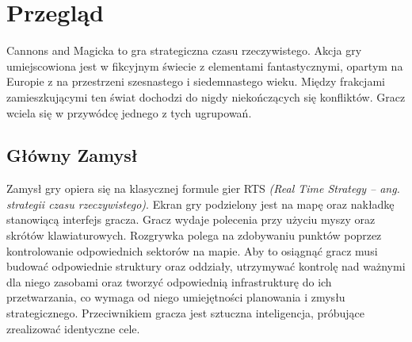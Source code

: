 \documentclass[a4paper]{scrreprt}
\title{\GameTiTle{}}
\subtitle{Dokument projektowy wersja 2}
\author{Laura Stasiulewicz}
\def \GameTiTle{Cannons and Magicka}
\begin{document}
\maketitle

\begin{abstract}
\GameTiTle{} to gra strategiczna czasu rzeczywistego. Celem gracza jest pokonanie komputerowego przeciwnika w walce o kontrolę nad punktem dominacji na mapie. Aby to uczynić, musi wykorzystać zdolność planowania, zarządzania zarówno jednostkami, jak i zasobami oraz wiedzy na temat dostępnych rodzajów oddziałów jakie może przywołać i interakcji między nimi.  %

\end{abstract}

{
  \hypersetup{linkcolor=black}
  \tableofcontents
}

\chapter{Przegląd}
\GameTiTle{} to gra strategiczna czasu rzeczywistego. Akcja gry umiejscowiona jest w fikcyjnym świecie z elementami fantastycznymi, opartym na Europie z na przestrzeni szesnastego i siedemnastego wieku. Między frakcjami zamieszkującymi ten świat dochodzi do nigdy niekończących się konfliktów. Gracz wciela się w przywódcę jednego z tych ugrupowań.
\section{Główny Zamysł}
Zamysł gry opiera się na klasycznej formule gier RTS \emph{(Real Time Strategy -- ang. strategii czasu rzeczywistego)}. Ekran gry podzielony jest na mapę oraz nakładkę stanowiącą interfejs gracza. Gracz wydaje polecenia przy użyciu myszy oraz skrótów klawiaturowych. Rozgrywka polega na zdobywaniu punktów poprzez kontrolowanie odpowiednich sektorów na mapie. Aby to osiągnąć gracz musi budować odpowiednie struktury oraz oddziały, utrzymywać kontrolę nad ważnymi dla niego zasobami oraz tworzyć odpowiednią infrastrukturę do ich przetwarzania, co wymaga od niego umiejętności planowania i zmysłu strategicznego. Przeciwnikiem gracza jest sztuczna inteligencja, próbujące zrealizować identyczne cele.
\end{document}
